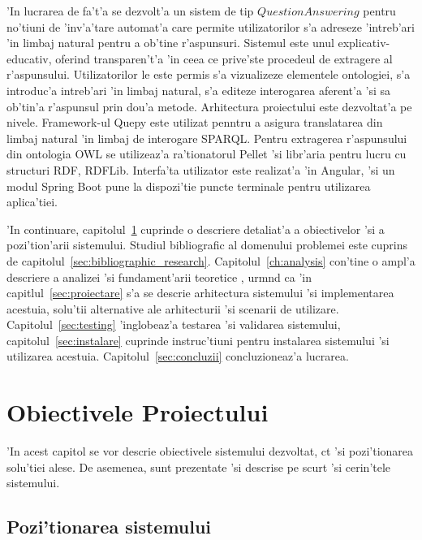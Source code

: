 \documentclass[12pt,a4paper,twoside]{report}
\begin{document}
'In lucrarea de fa't'a se dezvolt'a un sistem de tip $Question Answering$ pentru no'tiuni de 'inv'a'tare automat'a care permite utilizatorilor s'a adreseze 'intreb'ari 'in limbaj natural pentru a ob'tine r'aspunsuri. Sistemul este unul explicativ-educativ, oferind transparen't'a 'in ceea ce prive'ste procedeul de extragere al r'aspunsului. Utilizatorilor le este permis s'a vizualizeze elementele ontologiei, s'a introduc'a intreb'ari 'in limbaj natural, s'a editeze interogarea aferent'a 'si sa ob'tin'a r'aspunsul prin dou'a metode. Arhitectura proiectului este dezvoltat'a pe nivele. Framework-ul Quepy este utilizat penntru a asigura translatarea din limbaj natural 'in limbaj de interogare SPARQL. Pentru extragerea r'aspunsului din ontologia OWL se utilizeaz'a ra'tionatorul Pellet 'si libr'aria pentru lucru cu structuri RDF, RDFLib. Interfa'ta utilizator este realizat'a 'in Angular, 'si un modul Spring Boot pune la dispozi'tie puncte terminale pentru utilizarea aplica'tiei.

'In continuare, capitolul~\ref{sec:objectives} cuprinde o descriere detaliat'a a obiectivelor 'si a pozi'tion'arii  sistemului. Studiul bibliografic al domenului problemei este cuprins de capitolul~\ref{sec:bibliographic_research}. Capitolul~\ref{ch:analysis} con'tine o ampl'a descriere a analizei 'si fundament'arii teoretice , urm\ia nd ca 'in capitlul~\ref{sec:proiectare} s'a se descrie arhitectura sistemului 'si implementarea acestuia, solu'tii alternative ale arhitecturii 'si scenarii de utilizare. Capitolul~\ref{sec:testing} 'inglobeaz'a testarea 'si validarea sistemului, capitolul~\ref{sec:instalare} cuprinde instruc'tiuni pentru instalarea sistemului 'si utilizarea acestuia. Capitolul~\ref{sec:concluzii} concluzioneaz'a lucrarea.



\chapter{Obiectivele Proiectului}
\label{sec:objectives}

'In acest capitol se vor descrie obiectivele sistemului dezvoltat, c\ia t 'si pozi'tionarea solu'tiei alese. De asemenea, sunt prezentate 'si descrise pe scurt 'si cerin'tele sistemului.

\section{Pozi'tionarea sistemului}
\end{document}
